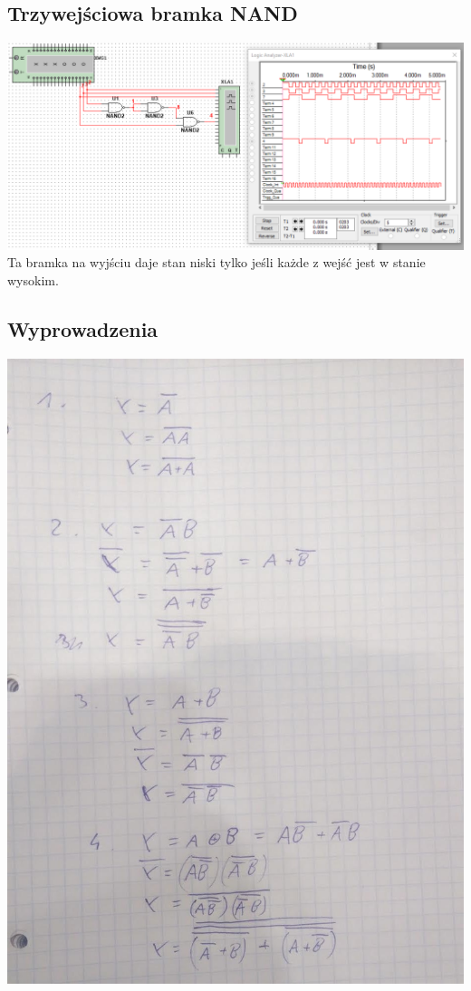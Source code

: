 \documentclass[12pt,a4paper]{article}
\begin{document}
\subsection{Trzywejściowa bramka NAND}
\includegraphics[width=\textwidth]{logic_analyzer/three_way_nand}
Ta bramka na wyjściu daje stan niski tylko jeśli każde z wejść jest w stanie wysokim.

\subsection{Wyprowadzenia}
\includegraphics[width=\textwidth]{przejscia}
\newpage
\end{document}
